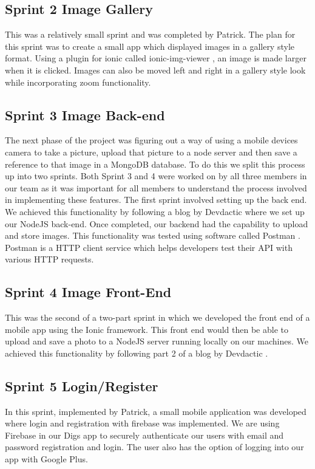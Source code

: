 \subsection{Sprint 2 Image Gallery}
This was a relatively small sprint and was completed by Patrick. The plan for this sprint was to create a small app which displayed images in a gallery style format. Using a plugin for ionic called ionic-img-viewer \cite{ImgViwer}, an image is made larger when it is clicked. Images can also be moved left and right in a gallery style look while incorporating zoom functionality. 

\subsection{Sprint 3 Image Back-end}
The next phase of the project was figuring out a way of using a mobile devices camera to take a picture, upload that picture to a node server and then save a reference to that image in a MongoDB database. To do this we split this process up into two sprints. Both Sprint 3 and 4 were worked on by all three members in our team as it was important for all members to understand the process involved in implementing these features. The first sprint involved setting up the back end. We achieved this functionality by following a blog by Devdactic \cite{ImageBackEnd} where we set up our NodeJS back-end. Once completed, our backend had the capability to upload and store images. This functionality was tested using software called Postman \cite{Postman}. Postman is a HTTP client service which helps developers test their API with various HTTP requests.

\subsection{Sprint 4 Image Front-End}
This was the second of a two-part sprint in which we developed the front end of a mobile app using the Ionic framework. This front end would then be able to upload and save a photo to a NodeJS server running locally on our machines. We achieved this functionality by following part 2 of a blog by Devdactic  \cite{ImageFrontEnd}. 

\subsection{Sprint 5 Login/Register}
In this sprint, implemented by Patrick, a small mobile application was developed where login and registration with firebase was implemented. We are using Firebase in our Digs app to securely authenticate our users with email and password registration and login. The user also has the option of logging into our app with Google Plus.


